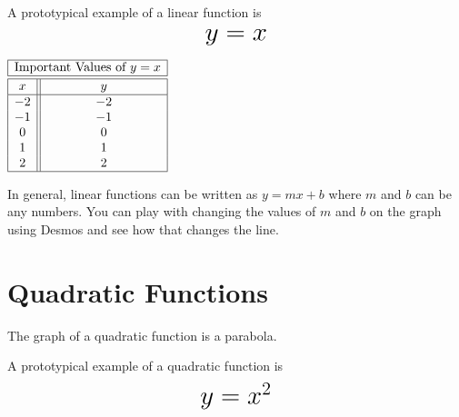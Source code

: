 \documentclass[nooutcomes]{ximera}
\begin{document}
A prototypical example of a linear function is $$ \mbox{\huge $y=x$}$$ 

\begin{image}
\end{image}

\begin{center}
$
\begin{array}{ |c || c|  }
 \hline
 \multicolumn{2}{|c|}{\text{\normalfont Important Values of } y=x} \\
\hline
 \hline
 x & y\\
 \hline
 -2&-2\\
 -1&-1\\
 0&0\\
 1&1\\
 2&2\\
 \hline
\end{array}
$
\end{center}

In general, linear functions can be written as $y=mx+b$ where $m$ and $b$ can be any numbers.  You can play with changing the values of $m$ and $b$ on the graph using Desmos and see how that changes the line.  

\begin{center}  
\end{center}


\newpage


\section{Quadratic Functions}

The graph of a quadratic function is a parabola.

A prototypical example of a quadratic function is $$ \mbox{\huge $y=x^2$}$$

\begin{image}
\end{image}
\end{document}
